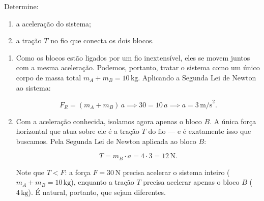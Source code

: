 \begin{exemplo}[Nível I]
Determine:

\begin{enumerate}
    \item [a)] a aceleração do sistema;
    \item [b)] a tração $T$ no fio que conecta os dois blocos.
\end{enumerate}

\resolucao

\begin{enumerate}

    \item [a)] Como os blocos estão ligados por um fio inextensível, eles se movem
    juntos com a mesma aceleração. Podemos, portanto, tratar o sistema como um único
    corpo de massa total $m_A + m_B = 10\,\text{kg}$. Aplicando a Segunda Lei de
    Newton ao sistema:

    $$F_R = (m_A + m_B)\,a \implies 30 = 10\,a \implies \boxed{a = 3\,\text{m/s}^2.}$$

    \item [b)] Com a aceleração conhecida, isolamos agora apenas o bloco $B$. A única
    força horizontal que atua sobre ele é a tração $T$ do fio — e é exatamente isso
    que buscamos. Pela Segunda Lei de Newton aplicada ao bloco $B$:

    $$T = m_B \cdot a = 4 \cdot 3 = \boxed{12\,\text{N.}}$$

    Note que $T < F$: a força $F = 30\,\text{N}$ precisa acelerar o sistema inteiro
    ($m_A + m_B = 10\,\text{kg}$), enquanto a tração $T$ precisa acelerar apenas o
    bloco $B$ ($4\,\text{kg}$). É natural, portanto, que sejam diferentes.

\end{enumerate}


\end{exemplo}

\vspace{0.3cm}





